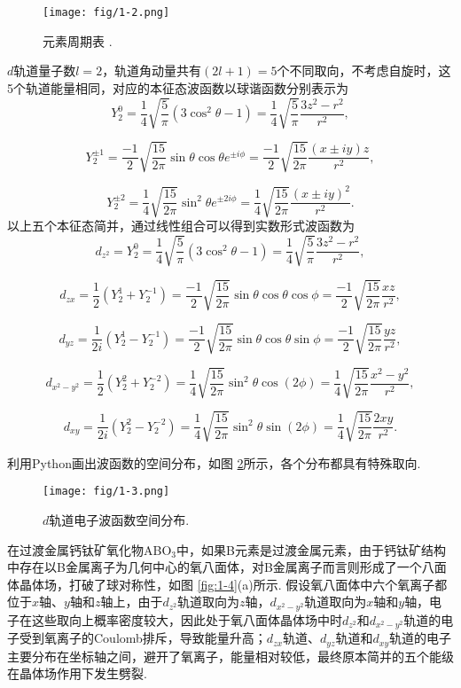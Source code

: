 \documentclass[12pt,a4paper,openany,twoside,UTF-8]{book}
\begin{document}
\begin{figure}[htbp]
\centering
\texttt{[image: fig/1-2.png]}
\caption{元素周期表 \cite{ref3}.}
\label{fig:1-2} 
\end{figure}

$d$轨道量子数$l = 2$，轨道角动量共有$(2l+1) = 5$个不同取向，不考虑自旋时，这5个轨道能量相同，对应的本征态波函数以球谐函数分别表示为
  $$Y_2^0=\frac{1}{4}\sqrt{\frac{5}{\pi}}(3\cos^2\theta-1)=\frac{1}{4}\sqrt{\frac{5}{\pi}}\frac{3z^2-r^2}{r^2},$$
  
  $$Y_2^{\pm 1}=\frac{-1}{2}\sqrt{\frac{15}{2\pi}}\sin\theta\cos\theta e^{\pm i\phi}=\frac{-1}{2}\sqrt{\frac{15}{2\pi}}\frac{(x\pm iy)z}{r^2},$$
  
  $$Y_2^{\pm 2}=\frac{1}{4}\sqrt{\frac{15}{2\pi}}\sin^2\theta e^{\pm 2i\phi}=\frac{1}{4}\sqrt{\frac{15}{2\pi}}\frac{(x\pm iy)^2}{r^2}.$$
以上五个本征态简并，通过线性组合可以得到实数形式波函数为
$$d_{z^2}=Y_2^0=\frac{1}{4}\sqrt{\frac{5}{\pi}}(3\cos^2\theta-1)=\frac{1}{4}\sqrt{\frac{5}{\pi}}\frac{3z^2-r^2}{r^2},$$
  
  $$d_{zx}=\frac{1}{2}(Y_2^1+Y_2^{-1})=\frac{-1}{2}\sqrt{\frac{15}{2\pi}}\sin\theta\cos\theta\cos\phi=\frac{-1}{2}\sqrt{\frac{15}{2\pi}}\frac{xz}{r^2},$$
  
  $$d_{yz}=\frac{1}{2i}(Y_2^1-Y_2^{-1})=\frac{-1}{2}\sqrt{\frac{15}{2\pi}}\sin\theta\cos\theta\sin\phi=\frac{-1}{2}\sqrt{\frac{15}{2\pi}}\frac{yz}{r^2},$$
    
  $$d_{x^2-y^2}=\frac{1}{2}(Y_2^2+Y_2^{-2})=\frac{1}{4}\sqrt{\frac{15}{2\pi}}\sin^2\theta\cos(2\phi)=\frac{1}{4}\sqrt{\frac{15}{2\pi}}\frac{x^2-y^2}{r^2},$$
  
  $$d_{xy}=\frac{1}{2i}(Y_2^2-Y_2^{-2})=\frac{1}{4}\sqrt{\frac{15}{2\pi}}\sin^2\theta\sin(2\phi)=\frac{1}{4}\sqrt{\frac{15}{2\pi}}\frac{2xy}{r^2}.$$

利用Python画出波函数的空间分布，如图 \ref{fig:1-3}所示，各个分布都具有特殊取向.

\begin{figure}[htbp]
\centering
\texttt{[image: fig/1-3.png]}
\caption{$d$轨道电子波函数空间分布.}
\label{fig:1-3} 
\end{figure}

在过渡金属钙钛矿氧化物ABO$_3$中，如果B元素是过渡金属元素，由于钙钛矿结构中存在以B金属离子为几何中心的氧八面体，对B金属离子而言则形成了一个八面体晶体场，打破了球对称性，如图 \ref{fig:1-4}(a)所示. 假设氧八面体中六个氧离子都位于$x$轴、$y$轴和$z$轴上，由于$d_{z^2}$轨道取向为$z$轴，$d_{x^2-y^2}$轨道取向为$x$轴和$y$轴，电子在这些取向上概率密度较大，因此处于氧八面体晶体场中时$d_{z^2}$和$d_{x^2-y^2}$轨道的电子受到氧离子的Coulomb排斥，导致能量升高；$d_{zx}$轨道、$d_{yz}$轨道和$d_{xy}$轨道的电子主要分布在坐标轴之间，避开了氧离子，能量相对较低，最终原本简并的五个能级在晶体场作用下发生劈裂. 
\end{document}
